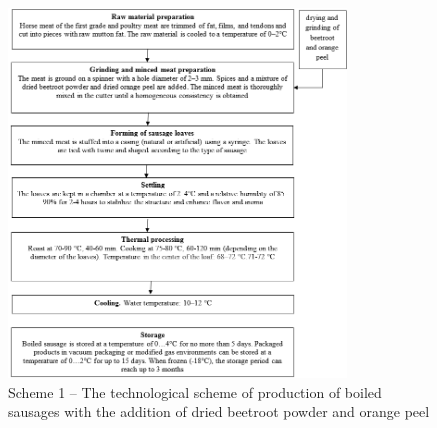 \begin{figure}[H]
	\centering
	\includegraphics[width=0.8\textwidth]{media/pish4/image10}
	\caption*{Scheme 1 -- The technological scheme of production of boiled sausages with the addition of dried beetroot powder and orange peel}
\end{figure}

